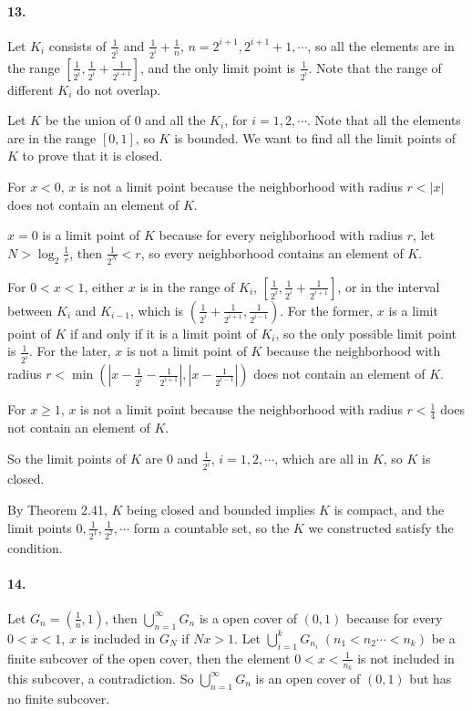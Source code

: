 \documentclass[a4paper]{article}
\begin{document}
\paragraph{13.}
Let $K_i$ consists of $\frac{1}{2^i}$ and $\frac{1}{2^i}+\frac{1}{n}$, $n=2^{i+1},2^{i+1}+1,\cdots$, so all the elements are in the range $[\frac{1}{2^i},\frac{1}{2^i}+\frac{1}{2^{i+1}}]$, and the only limit point is $\frac{1}{2^i}$. Note that the range of different $K_i$ do not overlap.

Let $K$ be the union of $0$ and all the $K_i$, for $i=1,2,\cdots$. Note that all the elements are in the range $[0,1]$, so $K$ is bounded. We want to find all the limit points of $K$ to prove that it is closed.
\medskip

For $x<0$, $x$ is not a limit point because the neighborhood with radius $r<|x|$ does not contain an element of $K$.

$x=0$ is a limit point of $K$ because for every neighborhood with radius $r$, let $N>\log_2\frac{1}{r}$, then $\frac{1}{2^N}<r$, so every neighborhood contains an element of $K$.

For $0<x<1$, either $x$ is in the range of $K_i$, $[\frac{1}{2^i},\frac{1}{2^i}+\frac{1}{2^{i+1}}]$, or in the interval between $K_i$ and $K_{i-1}$, which is $(\frac{1}{2^i}+\frac{1}{2^{i+1}},\frac{1}{2^{i-1}})$. For the former, $x$ is a limit point of $K$ if and only if it is a limit point of $K_i$, so the only possible limit point is $\frac{1}{2^i}$. For the later, $x$ is not a limit point of $K$ because the neighborhood with radius $r<\min\left(|x-\frac{1}{2^i}-\frac{1}{2^{i+1}}|,|x-\frac{1}{2^{i-1}}|\right)$ does not contain an element of $K$.

For $x\geq1$, $x$ is not a limit point because the neighborhood with radius $r<\frac{1}{4}$ does not contain an element of $K$.

So the limit points of $K$ are $0$ and $\frac{1}{2^i}$, $i=1,2,\cdots$, which are all in $K$, so $K$ is closed. 
\medskip

By Theorem 2.41, $K$ being closed and bounded implies $K$ is compact, and the limit points $0,\frac{1}{2^1},\frac{1}{2^2},\cdots$ form a countable set, so the $K$ we constructed satisfy the condition.

\paragraph{14.}
Let $G_n=(\frac{1}{n},1)$, then $\bigcup_{n=1}^\infty G_n$ is a open cover of $(0,1)$ because for every $0<x<1$, $x$ is included in $G_N$ if $Nx>1$. Let $\bigcup_{i=1}^kG_{n_i}\;(n_1<n_2\cdots<n_k)$ be a finite subcover of the open cover, then the element $0<x<\frac{1}{n_k}$ is not included in this subcover, a contradiction. So $\bigcup_{n=1}^\infty G_n$ is an open cover of $(0,1)$ but has no finite subcover.
\end{document}
